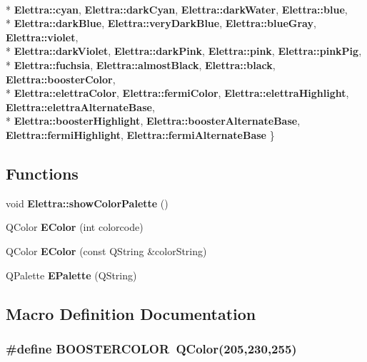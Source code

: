 \begin{DoxyCompactItemize}
\\*
{\bf Elettra\+::cyan}, 
{\bf Elettra\+::dark\+Cyan}, 
{\bf Elettra\+::dark\+Water}, 
{\bf Elettra\+::blue}, 
\\*
{\bf Elettra\+::dark\+Blue}, 
{\bf Elettra\+::very\+Dark\+Blue}, 
{\bf Elettra\+::blue\+Gray}, 
{\bf Elettra\+::violet}, 
\\*
{\bf Elettra\+::dark\+Violet}, 
{\bf Elettra\+::dark\+Pink}, 
{\bf Elettra\+::pink}, 
{\bf Elettra\+::pink\+Pig}, 
\\*
{\bf Elettra\+::fuchsia}, 
{\bf Elettra\+::almost\+Black}, 
{\bf Elettra\+::black}, 
{\bf Elettra\+::booster\+Color}, 
\\*
{\bf Elettra\+::elettra\+Color}, 
{\bf Elettra\+::fermi\+Color}, 
{\bf Elettra\+::elettra\+Highlight}, 
{\bf Elettra\+::elettra\+Alternate\+Base}, 
\\*
{\bf Elettra\+::booster\+Highlight}, 
{\bf Elettra\+::booster\+Alternate\+Base}, 
{\bf Elettra\+::fermi\+Highlight}, 
{\bf Elettra\+::fermi\+Alternate\+Base}
 \}
\end{DoxyCompactItemize}
\subsection*{Functions}
\begin{DoxyCompactItemize}
\item 
void {\bf Elettra\+::show\+Color\+Palette} ()
\item 
Q\+Color {\bf E\+Color} (int colorcode)
\item 
Q\+Color {\bf E\+Color} (const Q\+String \&color\+String)
\item 
Q\+Palette {\bf E\+Palette} (Q\+String)
\end{DoxyCompactItemize}


\subsection{Macro Definition Documentation}
\subsubsection[{B\+O\+O\+S\+T\+E\+R\+C\+O\+L\+OR}]{\setlength{\rightskip}{0pt plus 5cm}\#define B\+O\+O\+S\+T\+E\+R\+C\+O\+L\+OR~Q\+Color(205,230,255)}\label{bk3_2colors_8h_a52065541f963cd595a1df2f481486d73}
